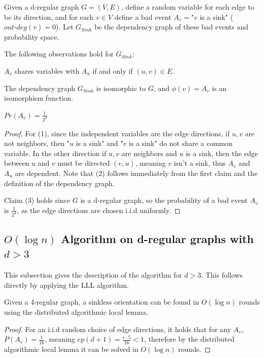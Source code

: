 \begin{definition}
Given a d-regular graph $G=(V,E)$, define a random variable for each edge to be its direction, and for each $v \in V$ define a bad event $A_v=$"$v$ is a sink" ($out\text{-}deg(v) = 0$). Let $G_{Sink}$ be the dependency graph of these bad events and probability space. 
\end{definition} 
\begin{lemma}
	\label{lem:rand_sink_dep_graph}
The following observations hold for $G_{Sink}$:
\begin{compactenum}
\item $A_v$  shares variables with  $A_u$ if and only if $(u,v) \in E$.
\item The dependency graph $G_{Sink}$ is isomorphic to $G$, and  $\phi(v) =A_v$ is an isomorphism function.
\item $Pr(A_v) = \frac{1}{2^d}$	
\end{compactenum}
\end{lemma}
\begin{proof}
For (1), since the independent variables are the edge directions, if $u,v$ are not neighbors, then "$u$ is a sink" and "$v$ is a sink" do not share a common variable. In the other direction if $u,v$ are neighbors and $u$ is a sink, then the edge between $u$ and $v$ must be directed $(v,u)$, meaning $v$ isn't a sink, thus $A_v$ and $A_u$ are dependent. Note that (2) follows immediately from the first claim and the definition of the dependency graph. 

Claim (3) holds since $G$ is a d-regular graph, so the probability of a bad event $A_v$ is $\frac{1}{2^d}$, as the edge directions are chosen i.i.d uniformly.
\end{proof}


\subsection{$O(\log{n})$ Algorithm on d-regular graphs with $d > 3$}
This subsection gives the description of the algorithm for $d > 3$. This follows directly by applying the LLL algorithm.

\begin{lemma}
Given a 4-regular graph, a sinkless orientation can be found in $O(\log{n})$ rounds using the distributed algorithmic local lemma.
\end{lemma}
\begin{proof}
For an i.i.d random choice of edge directions,  it holds that for any $A_v$,  $ P(A_v) = \frac{1}{16}$, meaning $ep(d+1) = \frac{e \cdot 5}{16} < 1$, therefore by the distributed algorithmic local lemma it can be solved in $O(\log{n})$ rounds.  
\end{proof}

